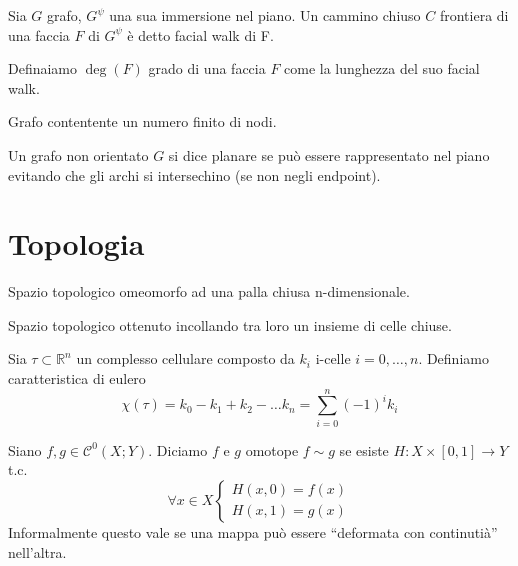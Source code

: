 \begin{definizione}
    Sia \(G\) grafo, \(G^\psi\) una sua immersione nel piano. Un cammino chiuso \(C\) frontiera di una faccia \(F\) di \(G^\psi\) è detto facial walk di F.
\end{definizione}

\begin{definizione}
    Definaiamo \(\deg(F)\) grado di una faccia \(F\) come la lunghezza del suo facial walk.
\end{definizione}
\begin{definizione}
    Grafo contentente un numero finito di nodi.
\end{definizione}
\begin{definizione}
    Un grafo non orientato \(G\) si dice planare se può essere rappresentato nel piano evitando che gli archi si intersechino (se non negli endpoint).
\end{definizione}
\chapter{Topologia}
\begin{definizione}
    Spazio topologico omeomorfo ad una palla chiusa n-dimensionale.
\end{definizione}
\begin{definizione}
    Spazio topologico ottenuto incollando tra loro un insieme di celle chiuse.
\end{definizione}
\begin{definizione}
    Sia \(\tau \subset \mathbb{R}^n\) un complesso cellulare composto da \(k_i\) i-celle \(i=0,\dots,n\). Definiamo caratteristica di eulero
    \begin{equation}
        \chi(\tau) = k_0 - k_1 + k_2 - \dots k_n = \sum_{i=0}^{n}{(-1)}^i k_i
    \end{equation}
\end{definizione}

\begin{definizione}
    Siano \(f,g \in \mathcal{C}^0(X;Y)\). Diciamo \(f\) e \(g\) omotope \(f \sim g\) se esiste \(H : X \times [0,1] \to Y\) t.c.
    \begin{equation}
        \forall x \in X \begin{cases}
            H(x,0)=f(x) \\
            H(x,1)=g(x)
        \end{cases}
    \end{equation}
    Informalmente questo vale se una mappa può essere “deformata con continutià” nell'altra.
\end{definizione}

